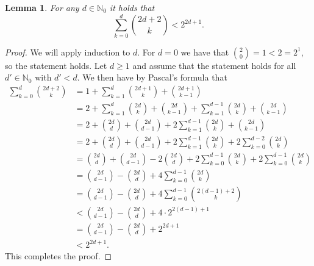 \documentclass[10pt, a4paper, twoside]{amsart}
\theoremstyle{plain}
\newtheorem{lemma}{Lemma}
\newcommand{\N}{\ensuremath{\mathbb{N}}}
\begin{document}
\begin{lemma}\label{lem:pascal}
 For any $d \in \N_0$ it holds that
 \begin{equation*}
  \sum_{k=0}^{d}\binom{2d+2}{k}<2^{2d+1}.
 \end{equation*}
\end{lemma}
\begin{proof}
 We will apply induction to $d$. For $d=0$ we have that $\binom{2}{0}=1<2=2^1$, so the statement holds.
 Let $d\geq 1$ and assume that the statement holds for all $d' \in \N_0$ with $d'<d$.
 We then have by Pascal's formula that
 \begin{align*}
  \sum_{k=0}^{d}\binom{2d+2}{k} &= 1+\sum_{k=1}^{d}\binom{2d+1}{k}+\binom{2d+1}{k-1} \\
  &= 2+\sum_{k=1}^{d}\binom{2d}{k}+\binom{2d}{k-1}+\sum_{k=1}^{d-1}\binom{2d}{k}+\binom{2d}{k-1} \\
  &= 2+\binom{2d}{d}+\binom{2d}{d-1}+2\sum_{k=1}^{d-1}\binom{2d}{k}+\binom{2d}{k-1} \\
  &= 2+\binom{2d}{d}+\binom{2d}{d-1}+2\sum_{k=1}^{d-1}\binom{2d}{k}+2\sum_{k=0}^{d-2}\binom{2d}{k} \\
  &= \binom{2d}{d}+\binom{2d}{d-1}-2\binom{2d}{d}+2\sum_{k=0}^{d-1}\binom{2d}{k}+2\sum_{k=0}^{d-1}\binom{2d}{k} \\
  &= \binom{2d}{d-1}-\binom{2d}{d}+4\sum_{k=0}^{d-1}\binom{2d}{k} \\
  &= \binom{2d}{d-1}-\binom{2d}{d}+4\sum_{k=0}^{d-1}\binom{2(d-1)+2}{k} \\
  &< \binom{2d}{d-1}-\binom{2d}{d}+4\cdot 2^{2(d-1)+1} \\
  &= \binom{2d}{d-1}-\binom{2d}{d}+ 2^{2d+1} \\
  &< 2^{2d+1}.
 \end{align*}
 This completes the proof.
\end{proof}
\end{document}
